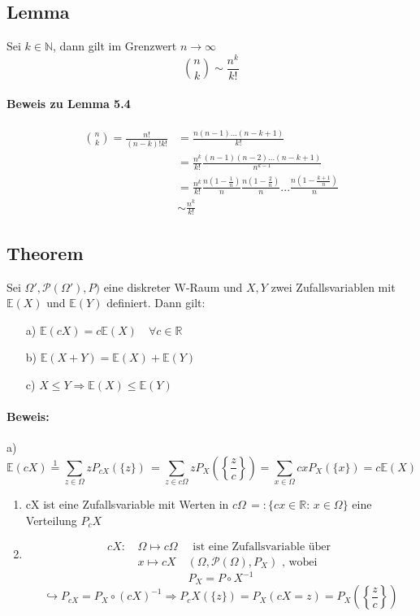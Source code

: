 \documentclass[12pt,a4paper]{article}
\begin{document}
 	\subsection{Lemma}
 	Sei $k\in\mathbb{N}$, dann gilt im Grenzwert $n\to\infty$
 	$$\binom{n}{k}\sim \frac{n^k}{k!}$$
 	
 	\paragraph{Beweis zu Lemma 5.4}
 	\begin{equation*}
 	\begin{split}
 	\binom{n}{k} = \frac{n!}{(n-k)!k!} & = \frac{n(n-1)...(n-k+1)}{k!}\\
 	& = \frac{n^k}{k!}\frac{(n-1)(n-2)...(n-k+1)}{n^{k-1}}\\
 	& = \frac{n^k}{k!}\frac{n\left(1-\frac{1}{n}\right)}{n} \frac{n\left(1-\frac{2}{n}\right)}{n} ... \frac{n\left(1-\frac{k+1}{n}\right)}{n}\\
 	& \sim \frac{n^k}{k!}
 	\end{split}
 	\end{equation*}
 	
 	\subsection{Theorem}
 	Sei $\Omega',\mathcal{P}(\Omega'),P)$ eine diskreter W-Raum und $X,Y$ zwei Zufallsvariablen mit $\mathbb{E}(X)$ und $\mathbb{E}(Y)$ definiert. Dann gilt:
 	\begin{itemize}
 	\item[a)] $\mathbb{E}(cX) = c\mathbb{E}(X) \quad \forall c\in\mathbb{R}$
 	\item[b)] $\mathbb{E}(X+Y) = \mathbb{E}(X) + \mathbb{E}(Y)$
 	\item[c)] $X\leq Y \Rightarrow\mathbb{E}(X)\leq\mathbb{E}(Y)$
 	\end{itemize}
 	\paragraph{Beweis:}
 	a)
 	$$\mathbb{E}(cX)\stackrel{1}{=}\sum_{z\in\Omega}zP_{cX}(\{z\})\,
 	=\sum_{z\in c\Omega}zP_X\left(\left\{\frac{z}{c}\right\}\right)
 	=\sum_{x\in\Omega}cxP_X(\{x\})=c\mathbb{E}(X)$$
 	\begin{enumerate}
 	\item cX ist eine Zufallsvariable mit Werten in $c\Omega\,=:\{cx\in\mathbb{R}:\,x\in\Omega\}$ eine Verteilung $P_cX$
 	\item 
 	\begin{equation*}
 	\begin{split}
 	cX:\, & \Omega\mapsto c\Omega \quad \text{ ist eine Zufallsvariable über }\\ 
 	& x\mapsto cX \quad (\Omega,\mathcal{P}(\Omega),P_X) \text{ , wobei}
 	\end{split}
 	\end{equation*}
	$$P_X=P\circ X^{-1}$$
	$$\hookrightarrow P_{cX}=P_X\circ (cX)^{-1} \Rightarrow P_cX(\{z\})=P_X(cX=z)
	=P_X\left(\left\{\frac{z}{c}\right\}\right)$$	 	
 	\end{enumerate}
 	
\end{document}
